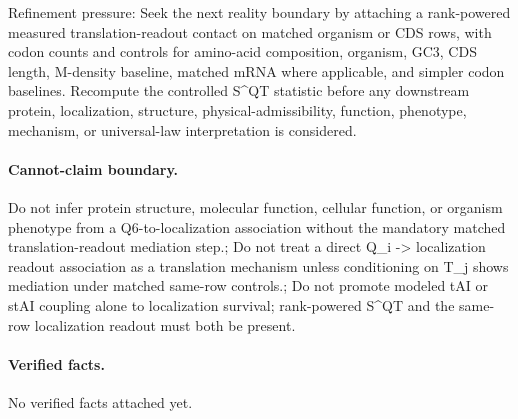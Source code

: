 Refinement pressure: Seek the next reality boundary by attaching a rank-powered measured translation-readout contact on matched organism or CDS rows, with codon counts and controls for amino-acid composition, organism, GC3, CDS length, M-density baseline, matched mRNA where applicable, and simpler codon baselines. Recompute the controlled S\textasciicircum{}QT statistic before any downstream protein, localization, structure, physical-admissibility, function, phenotype, mechanism, or universal-law interpretation is considered.

\paragraph{Cannot-claim boundary.} Do not infer protein structure, molecular function, cellular function, or organism phenotype from a Q6-to-localization association without the mandatory matched translation-readout mediation step.; Do not treat a direct Q\_i -> localization readout association as a translation mechanism unless conditioning on T\_j shows mediation under matched same-row controls.; Do not promote modeled tAI or stAI coupling alone to localization survival; rank-powered S\textasciicircum{}QT and the same-row localization readout must both be present.

\paragraph{Verified facts.}
No verified facts attached yet.

